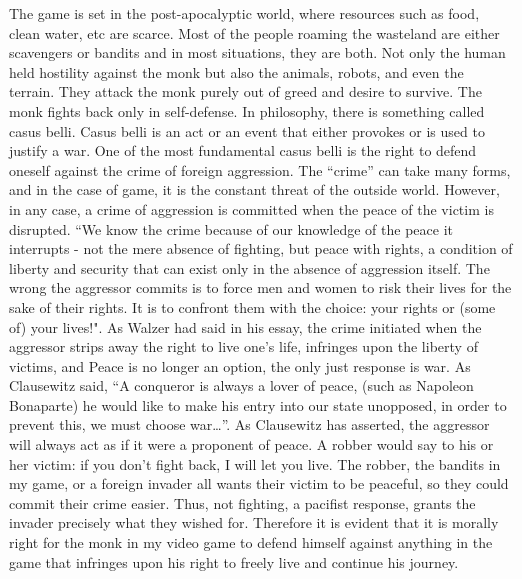 \documentclass[10pt,twocolumn]{article}
\begin{document}
The game is set in the post-apocalyptic world, where resources such as food, clean water, etc are scarce. Most of the people roaming the wasteland are either scavengers or bandits and in most situations, they are both. Not only the human held hostility against the monk but also the animals, robots, and even the terrain. They attack the monk purely out of greed and desire to survive. The monk fights back only in self-defense. In philosophy, there is something called casus belli. Casus belli is an act or an event that either provokes or is used to justify a war. One of the most fundamental casus belli is the right to defend oneself against the crime of foreign aggression. The “crime” can take many forms, and in the case of game, it is the constant threat of the outside world. However, in any case, a crime of aggression is committed when the peace of the victim is disrupted. “We know the crime because of our knowledge of the peace it interrupts - not the mere absence of fighting, but peace with rights, a condition of liberty and security that can exist only in the absence of aggression itself. The wrong the aggressor commits is to force men and women to risk their lives for the sake of their rights. It is to confront them with the choice: your rights or (some of) your lives!"\cite{orend1999kant}. As Walzer had said in his essay, the crime initiated when the aggressor strips away the right to live one's life, infringes upon the liberty of victims, and Peace is no longer an option, the only just response is war. As Clausewitz said, “A conqueror is always a lover of peace, (such as Napoleon Bonaparte) he would like to make his entry into our state unopposed, in order to prevent this, we must choose war…”\cite{orend1999kant}. As Clausewitz has asserted, the aggressor will always act as if it were a proponent of peace. A robber would say to his or her victim: if you don't fight back, I will let you live. The robber, the bandits in my game, or a foreign invader all wants their victim to be peaceful, so they could commit their crime easier. Thus, not fighting, a pacifist response, grants the invader precisely what they wished for. Therefore it is evident that it is morally right for the monk in my video game to defend himself against anything in the game that infringes upon his right to freely live and continue his journey.
\end{document}
